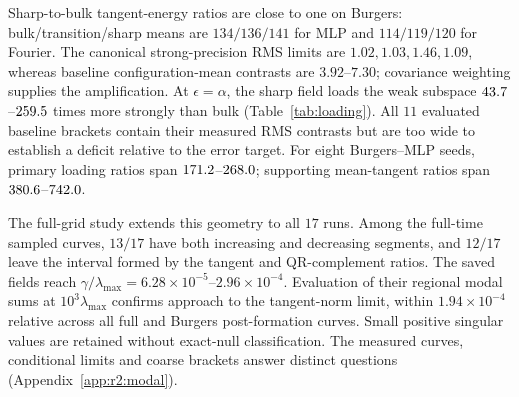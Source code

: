 Sharp-to-bulk tangent-energy ratios are close to one on Burgers: bulk/transition/sharp
means are $134/136/141$ for MLP and $114/119/120$ for Fourier. The canonical
strong-precision RMS limits are $1.02,1.03,1.46,1.09$, whereas baseline configuration-mean
contrasts are $3.92$--$7.30$; covariance weighting supplies the amplification.
At $\epsilon=\alpha$, the sharp field loads the weak subspace
$43.7$--$259.5$ times more strongly
than bulk (Table~\ref{tab:loading}). All $11$ evaluated baseline brackets contain their measured RMS
contrasts but are too wide to establish a deficit relative to the error target.
For eight Burgers--MLP seeds, primary loading ratios span
$171.2$--$268.0$; supporting mean-tangent ratios
span $380.6$--$742.0$.

The full-grid study extends this geometry to all $17$ runs. Among the full-time sampled
curves, $13/17$ have both increasing and decreasing segments, and $12/17$ leave the
interval formed by the tangent and QR-complement ratios. The saved fields reach
$\gamma/\lambda_{\max}=6.28\times10^{-5}$--$2.96\times10^{-4}$. Evaluation of
their regional modal sums at $10^3\lambda_{\max}$ confirms approach to the
tangent-norm limit, within $1.94\times10^{-4}$ relative across all full and
Burgers post-formation curves. Small positive singular values are retained without
exact-null classification. The measured curves, conditional limits and coarse
brackets answer distinct questions (Appendix~\ref{app:r2:modal}).
